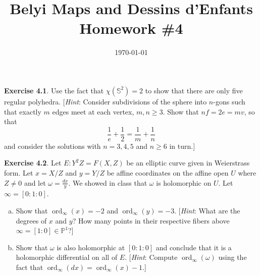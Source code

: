 \documentclass[12pt]{amsart}
\newenvironment{exolab}[1]
{\noindent\textbf{Exercise #1}.}
{\vskip 6pt}
\theoremstyle{remark}
\renewcommand{\P}{\mathbb P}
\newcommand{\PP}{\mathbb P}
\renewcommand{\SS}{\mathbb S}
\DeclareMathOperator{\ord}{ord}
\begin{document}
\title{Belyi Maps and Dessins d'Enfants \\ Homework \#4}
\date{\today}


\maketitle

\begin{exolab}{4.1}
  Use the fact that $\chi(\SS^2) = 2$ to show that there are only five regular polyhedra.  [\textit{Hint}: Consider subdivisions of the sphere into $n$-gons such that exactly $m$ edges meet at each vertex, $m ,n \geq 3$.  Show that $nf = 2e = mv$, so that
  $$
    \frac{1}{e} + \frac{1}{2} = \frac{1}{m} + \frac{1}{n}
  $$
  and consider the solutions with $n = 3, 4, 5$ and $n \geq 6$ in turn.]
\end{exolab}


\begin{exolab}{4.2}
  Let $E: Y^2 Z = F(X,Z)$ be an elliptic curve given in Weierstrass form. Let $x = X/Z$ and $y = Y/Z$ be affine coordinates on the affine open $U$ where $Z \neq 0$ and let $\omega = \frac{dx}{y}$. We showed in class that $\omega$ is holomorphic on $U$. Let $\infty = [0:1:0]$.
  \begin{enumerate}[(a)]
    \item 
      Show that $\ord_\infty(x) = -2$ and $\ord_\infty(y) = -3$. [\textit{Hint}: What are the degrees of $x$ and $y$? How many points in their respective fibers above $\infty = [1:0] \in \PP^1$?]
    \item
      Show that $\omega$ is also holomorphic at $[0:1:0]$ and conclude that it is a holomorphic differential on all of $E$. [\textit{Hint}: Compute $\ord_\infty(\omega)$ using the fact that $\ord_\infty(dx) = \ord_\infty(x) - 1$.]
  \end{enumerate}
\end{exolab}

\end{document}
